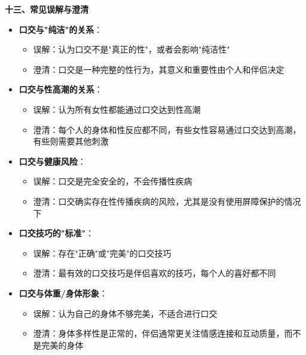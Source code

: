 \documentclass[12pt,UTF8]{ctexbook}
\begin{document}
  \textbf{十三、常见误解与澄清}
  \begin{itemize}
  \item \textbf{口交与"纯洁"的关系}：
    \begin{itemize}
    \item 误解：认为口交不是"真正的性"，或者会影响"纯洁性"
    \item 澄清：口交是一种完整的性行为，其意义和重要性由个人和伴侣决定
    \end{itemize}
  \item \textbf{口交与性高潮的关系}：
    \begin{itemize}
    \item 误解：认为所有女性都能通过口交达到性高潮
    \item 澄清：每个人的身体和性反应都不同，有些女性容易通过口交达到高潮，有些则需要其他刺激
    \end{itemize}
  \item \textbf{口交与健康风险}：
    \begin{itemize}
    \item 误解：口交是完全安全的，不会传播性疾病
    \item 澄清：口交确实存在性传播疾病的风险，尤其是没有使用屏障保护的情况下
    \end{itemize}
  \item \textbf{口交技巧的"标准"}：
    \begin{itemize}
    \item 误解：存在"正确"或"完美"的口交技巧
    \item 澄清：最有效的口交技巧是伴侣喜欢的技巧，每个人的喜好都不同
    \end{itemize}
  \item \textbf{口交与体重/身体形象}：
    \begin{itemize}
    \item 误解：认为自己的身体不够完美，不适合进行口交
    \item 澄清：身体多样性是正常的，伴侣通常更关注情感连接和互动质量，而不是完美的身体
    \end{itemize}
  \end{itemize}
\end{document}
